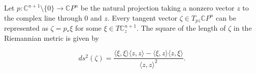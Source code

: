 Let $p: \mathbb{C}^{n+1} \setminus \{0\} \to \mathbb{C}P^n$ be the natural projection taking a nonzero vector $z$ to the complex line through $0$ and $z$. Every tangent vector $\zeta \in T_{pz}\mathbb{C}P^n$ can be represented as $\zeta = p_* \xi$ for some $\xi \in T\mathbb{C}_z^{n+1}$. The square of the length of $\zeta$ in the Riemannian metric is given by

$$ds^2(\zeta) = \frac{\langle \xi, \xi \rangle \langle z, z \rangle - \langle \xi, z \rangle \langle z, \xi \rangle}{\langle z, z \rangle^2}.$$
